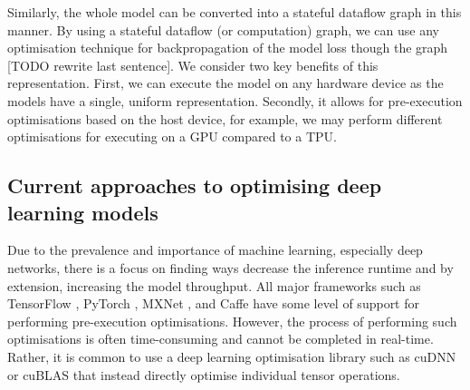 Similarly, the whole model can be converted into a stateful dataflow graph in this manner. By using a stateful dataflow (or computation) graph, we can use any optimisation technique for backpropagation of the model loss though the graph [TODO rewrite last sentence]. We consider two key benefits of this representation. First, we can execute the model on any hardware device as the models have a single, uniform representation. Secondly, it allows for pre-execution optimisations based on the host device, for example, we may perform different optimisations for executing on a GPU compared to a TPU.

\subsection{Current approaches to optimising deep learning models}

Due to the prevalence and importance of machine learning, especially deep networks, there is a focus on finding ways decrease the inference runtime and by extension, increasing the model throughput. All major frameworks such as TensorFlow \cite{Tensorflow2015-whitepaper}, PyTorch \cite{pytorch}, MXNet \cite{chen2015mxnet}, and Caffe \cite{jia2014caffe} have some level of support for performing pre-execution optimisations. However, the process of performing such optimisations is often time-consuming and cannot be completed in real-time. Rather, it is common to use a deep learning optimisation library such as cuDNN \cite{chetlur2014cudnn} or cuBLAS \cite{cublas2008} that instead directly optimise individual tensor operations.



